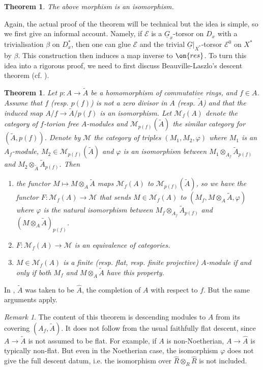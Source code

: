 \documentclass[]{pcmi}
\theoremstyle{plain}
\newtheorem{thm}[equation]{Theorem}
\theoremstyle{remark}
\newtheorem{rmk}[equation]{Remark}
\theoremstyle{definition}
\newcommand{\mE}{{\mathcal E}}
\newcommand{\mM}{{\mathcal M}}
\begin{document}
\begin{thm}\label{glob aff}
The above morphism is an isomorphism.
\end{thm}
Again, the actual proof of the theorem will be technical but the idea is simple, so we first give an informal account. Namely, if $\mE$ is a $\underline G_x$-torsor on $D_x$ with a trivialisation $\beta$ on $D_x^*$, then one can glue $\mE$ and the trivial $\underline G|_{X^*}$-torsor $\mE^0$ on $X^*$ by $\beta$. This construction then induces a map inverse to $\on{res}$. 
To turn this idea into a rigorous proof, we need to first discuss Beauville-Laszlo's descent theorem (cf. \cite{BL2}). 
\begin{thm}\label{descent lemma}
Let $p: A\to \tilde{A}$ be a homomorphism of commutative rings, and $f\in A$. Assume that $f$ (resp. $p(f)$) is not a zero divisor in $A$ (resp. $\tilde{A}$) and that the induced map $A/f\to \tilde{A}/p(f)$ is an isomorphism. Let $\mM_f(A)$ denote the category of $f$-torion free $A$-modules and $\mM_{p(f)}(\tilde{A})$ the similar category for $(\tilde{A},p(f))$. Denote by $\mM$ the category of triples $(M_1,M_2,\varphi)$ where $M_1$ is an $A_f$-module, $M_2\in \mM_{p(f)}(\tilde{A})$ and $\varphi$ is an isomorphism between $M_1\otimes_{A_f}\tilde{A}_{p(f)}$ and $M_2\otimes_{\tilde{A}}\tilde{A}_{p(f)}$. Then
\begin{enumerate}
\item the functor $M\mapsto M\otimes_A\tilde{A}$ maps $\mM_f(A)$ to $\mM_{p(f)}(\tilde{A})$, so we have the functor $F : \mM_f(A)\to \mM$ that sends $M\in\mM_f(A)$
to $(M_f, M\otimes_A\tilde{A}, \varphi)$ where
$\varphi$ is the natural isomorphism between $M_f\otimes_{A_f}\tilde{A}_{p(f)}$ and $(M\otimes_A\tilde{A})_{p(f)}$.
\item $F : \mM_f(A)\to \mM$ is an equivalence of categories.
\item $M\in\mM_f(A)$ is a finite (resp. flat, resp. finite projective) $A$-module if and only if both $M_f$ and $M\otimes_A\tilde{A}$ have this property.
\end{enumerate}
\end{thm}
In \cite{BL2}, $\tilde{A}$ was taken to be $\hat A$, the completion of $A$ with respect to $f$. But the same arguments apply.
\begin{rmk}
The content of this theorem is descending modules to $A$ from its covering $(A_f, \tilde A)$. It
does not follow from the usual faithfully flat descent, since $A\to \tilde A$ is not assumed to be flat. For example, if $A$ is non-Noetherian, $A\to \hat A$ is typically non-flat. But even in the Noetherian case, the isomorphism $\varphi$ does not give the full descent datum, i.e. the isomorphism over $\hat R\otimes_R\hat R$ is not included.
\end{rmk}
\end{document}
